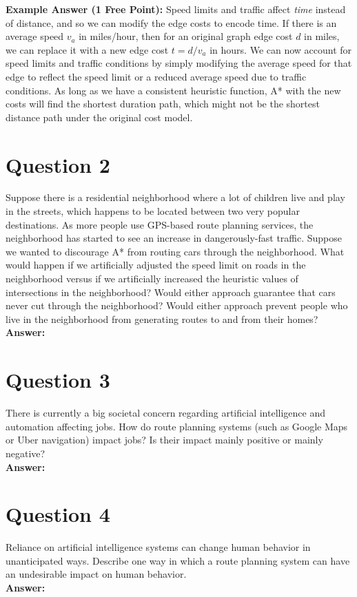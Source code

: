 \documentclass[12pt]{extarticle}
\begin{document}
\noindent\textbf{Example Answer (1 Free Point):} Speed limits and traffic affect \emph{time} instead of distance, and so we can modify the edge costs to encode time. If there is an average speed $v_a$ in miles/hour, then for an original graph edge cost $d$ in miles, we can replace it with a new edge cost $t = d/v_a$ in hours. We can now account for speed limits and traffic conditions by simply modifying the average speed for that edge to reflect the speed limit or a reduced average speed due to traffic conditions. As long as we have a consistent heuristic function, A* with the new costs will find the shortest duration path, which might not be the shortest distance path under the original cost model.

\newpage
\section*{Question 2}

Suppose there is a residential neighborhood where a lot of children live and play in the streets, which happens to be located between two very popular destinations. As more people use GPS-based route planning services, the neighborhood has started to see an increase in dangerously-fast traffic. Suppose we wanted to discourage A* from routing cars through the neighborhood. What would happen if we artificially adjusted the speed limit on roads in the neighborhood versus if we artificially increased the heuristic values of intersections in the neighborhood?   Would either approach guarantee that cars never cut through the neighborhood? Would either approach prevent people who live in the neighborhood from generating routes to and from their homes? \\

\noindent\textbf{Answer:} 

\newpage
\section*{Question 3}

There is currently a big societal concern regarding artificial intelligence and automation affecting jobs.  How do route planning systems (such as Google Maps or Uber navigation) impact jobs?  Is their impact mainly positive or mainly negative?\\

\noindent\textbf{Answer:} 

\newpage
\section*{Question 4}

Reliance on artificial intelligence systems can change human behavior in unanticipated ways.  Describe one way in which a route planning system can have an undesirable impact on human behavior.\\

\noindent\textbf{Answer:}
\end{document}
